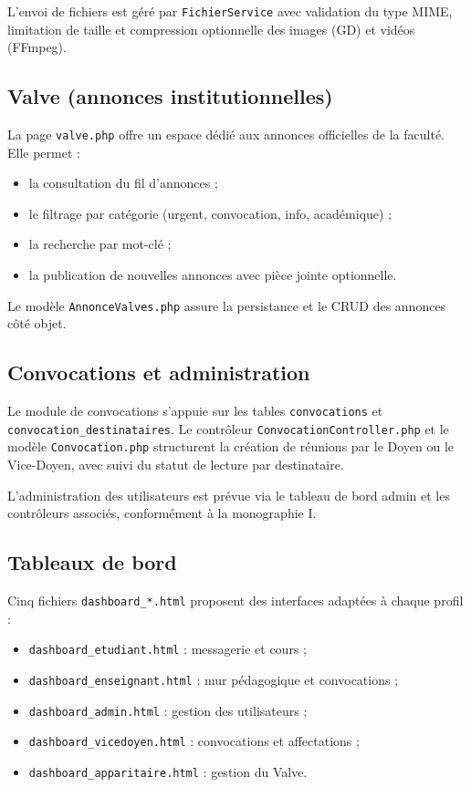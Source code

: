 \documentclass[12pt,a4paper]{article}
\begin{document}
L'envoi de fichiers est géré par \texttt{FichierService} avec validation du type MIME, limitation de taille et compression optionnelle des images (GD) et vidéos (FFmpeg).

\subsection{Valve (annonces institutionnelles)}

La page \texttt{valve.php} offre un espace dédié aux annonces officielles de la faculté. Elle permet :
\begin{itemize}
  \item la consultation du fil d'annonces ;
  \item le filtrage par catégorie (urgent, convocation, info, académique) ;
  \item la recherche par mot-clé ;
  \item la publication de nouvelles annonces avec pièce jointe optionnelle.
\end{itemize}

Le modèle \texttt{AnnonceValves.php} assure la persistance et le CRUD des annonces côté objet.

\subsection{Convocations et administration}

Le module de convocations s'appuie sur les tables \texttt{convocations} et \texttt{convocation\_destinataires}. Le contrôleur \texttt{ConvocationController.php} et le modèle \texttt{Convocation.php} structurent la création de réunions par le Doyen ou le Vice-Doyen, avec suivi du statut de lecture par destinataire.

L'administration des utilisateurs est prévue via le tableau de bord admin et les contrôleurs associés, conformément à la monographie I.

\subsection{Tableaux de bord}

Cinq fichiers \texttt{dashboard\_*.html} proposent des interfaces adaptées à chaque profil :
\begin{itemize}
  \item \texttt{dashboard\_etudiant.html} : messagerie et cours ;
  \item \texttt{dashboard\_enseignant.html} : mur pédagogique et convocations ;
  \item \texttt{dashboard\_admin.html} : gestion des utilisateurs ;
  \item \texttt{dashboard\_vicedoyen.html} : convocations et affectations ;
  \item \texttt{dashboard\_apparitaire.html} : gestion du Valve.
\end{itemize}
\end{document}
